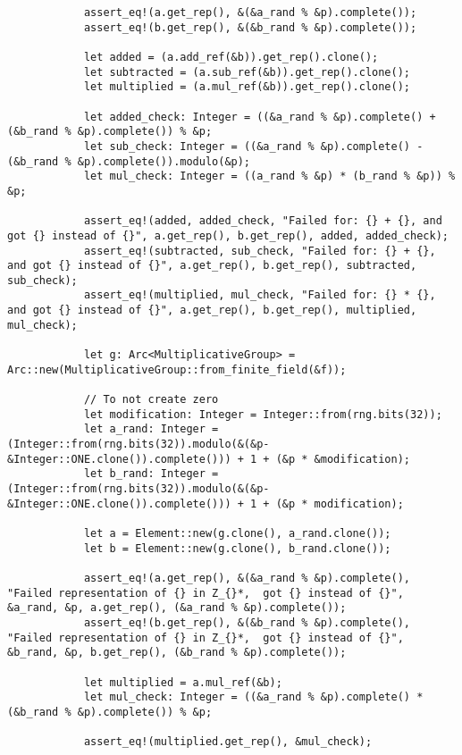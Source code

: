 \begin{verbatim}
            assert_eq!(a.get_rep(), &(&a_rand % &p).complete());
            assert_eq!(b.get_rep(), &(&b_rand % &p).complete());

            let added = (a.add_ref(&b)).get_rep().clone();
            let subtracted = (a.sub_ref(&b)).get_rep().clone();
            let multiplied = (a.mul_ref(&b)).get_rep().clone();

            let added_check: Integer = ((&a_rand % &p).complete() + (&b_rand % &p).complete()) % &p;
            let sub_check: Integer = ((&a_rand % &p).complete() - (&b_rand % &p).complete()).modulo(&p);
            let mul_check: Integer = ((a_rand % &p) * (b_rand % &p)) % &p;

            assert_eq!(added, added_check, "Failed for: {} + {}, and got {} instead of {}", a.get_rep(), b.get_rep(), added, added_check);
            assert_eq!(subtracted, sub_check, "Failed for: {} + {}, and got {} instead of {}", a.get_rep(), b.get_rep(), subtracted, sub_check);
            assert_eq!(multiplied, mul_check, "Failed for: {} * {}, and got {} instead of {}", a.get_rep(), b.get_rep(), multiplied, mul_check);

            let g: Arc<MultiplicativeGroup> = Arc::new(MultiplicativeGroup::from_finite_field(&f));

            // To not create zero
            let modification: Integer = Integer::from(rng.bits(32));
            let a_rand: Integer = (Integer::from(rng.bits(32)).modulo(&(&p-&Integer::ONE.clone()).complete())) + 1 + (&p * &modification);
            let b_rand: Integer = (Integer::from(rng.bits(32)).modulo(&(&p-&Integer::ONE.clone()).complete())) + 1 + (&p * modification);

            let a = Element::new(g.clone(), a_rand.clone());
            let b = Element::new(g.clone(), b_rand.clone());

            assert_eq!(a.get_rep(), &(&a_rand % &p).complete(), "Failed representation of {} in Z_{}*,  got {} instead of {}", &a_rand, &p, a.get_rep(), (&a_rand % &p).complete());
            assert_eq!(b.get_rep(), &(&b_rand % &p).complete(), "Failed representation of {} in Z_{}*,  got {} instead of {}", &b_rand, &p, b.get_rep(), (&b_rand % &p).complete());

            let multiplied = a.mul_ref(&b);
            let mul_check: Integer = ((&a_rand % &p).complete() * (&b_rand % &p).complete()) % &p;

            assert_eq!(multiplied.get_rep(), &mul_check);


\end{verbatim}
